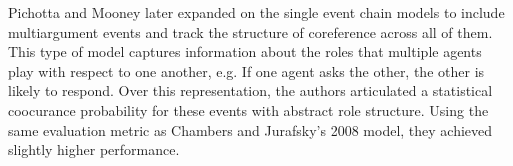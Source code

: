 \documentclass[10pt,a4paper]{article}
\newcommand{\todo}[1]{{\color{red}#1}}
\begin{document}
% 


Pichotta and Mooney  later expanded on the single event chain models to include multiargument events and track the structure of coreference across all of them. This type of model captures information about the roles that multiple agents play with respect to one another, e.g. If one agent asks the other, the other is likely to respond. Over this representation, the authors articulated a statistical coocurance probability for these events with abstract role structure. Using the same evaluation metric as Chambers and Jurafsky's 2008 model, they achieved slightly higher performance.

\end{document}
